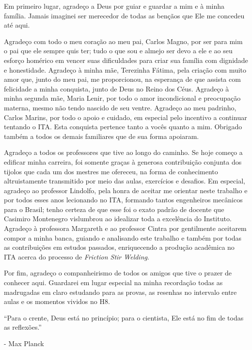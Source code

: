 \documentclass[12pt,openany]{report}
\begin{document}
Em primeiro lugar, agradeço a Deus por guiar e guardar a mim e à minha família. Jamais imaginei ser merecedor de todas as bençãos que Ele me concedeu até aqui.

Agradeço com todo o meu coração ao meu pai, Carlos Magno, por ser para mim o pai que ele sempre quis ter; tudo o que sou e almejo ser devo a ele e ao seu esforço homérico em vencer suas dificuldades para criar sua família com dignidade e honestidade. Agradeço à minha mãe, Terezinha Fátima, pela criação com muito amor que, junto do meu pai, me proporcionou, na esperança de que assista com felicidade a minha conquista, junto de Deus no Reino dos Céus. Agradeço à minha segunda mãe, Maria Lenir, por todo o amor incondicional e preocupação materna, mesmo não tendo nascido de seu ventre. Agradeço ao meu padrinho, Carlos Marins, por todo o apoio e cuidado, em especial pelo incentivo a continuar tentando o ITA. Esta conquista pertence tanto a vocês quanto a mim. Obrigado também a todos os demais familiares que de sua forma apoiaram.

Agradeço a todos os professores que tive ao longo do caminho. Se hoje começo a edificar minha carreira, foi somente graças à generosa contribuição conjunta dos tijolos que cada um dos mestres me ofereceu, na forma de conhecimento altruistamente transmitido por meio das aulas, exercícios e desafios. Em especial, agradeço ao professor Lindolfo, pela honra de aceitar me orientar neste trabalho e por todos esses anos lecionando no ITA, formando tantos engenheiros mecânicos para o Brasil; tenho certeza de que esse foi o exato padrão de docente que Casimiro Montenegro vislumbrou ao idealizar toda a excelência do Instituto. Agradeço à professora Margareth e ao professor Cintra por gentilmente aceitarem compor a minha banca, guiando e analisando este trabalho e também por todas as contribuições em estudos passados, enriquecendo a produção acadêmica no ITA acerca do processo de \textit{Friction Stir Welding}.

Por fim, agradeço o companheirismo de todos os amigos que tive o prazer de conhecer aqui. Guardarei em lugar especial na minha recordação todas as madrugadas em claro estudando para as provas, as resenhas no intervalo entre aulas e os momentos vividos no H8.


\newpage

\vspace*{\fill}
\begin{flushright}
\begin{minipage}{0.6\textwidth}
\raggedleft ``Para o crente, Deus está no princípio; para o cientista, Ele está no fim de todas as \mbox{reflexões.''}\par
\vspace{4pt}
\raggedleft - Max Planck
\end{minipage}
\end{flushright}
\newpage
\end{document}
